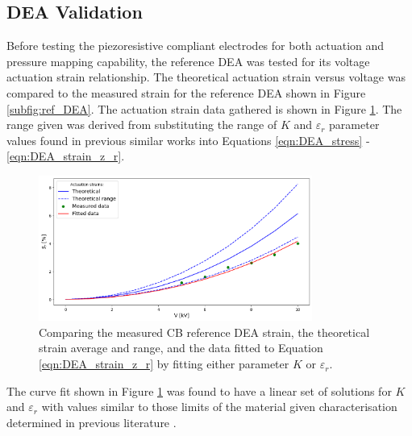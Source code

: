 \subsection{DEA Validation}
\label{subsec:dea_validation2}
Before testing the piezoresistive compliant electrodes for both actuation and pressure mapping capability, the reference DEA was tested for its voltage actuation strain relationship. The theoretical actuation strain versus voltage was compared to the measured strain for the reference DEA shown in Figure \ref{subfig:ref_DEA}. The actuation strain data gathered is shown in Figure \ref{fig:ref_DEA_results}. The range given was derived from substituting the range of $K$ and $\varepsilon_r$ parameter values found in previous similar works\cite{Liu2018, Helal2018, Huang2023} into Equations \ref{eqn:DEA_stress} - \ref{eqn:DEA_strain_z_r}.
\begin{figure}[H]
	\centering
	\includegraphics[width = 0.8\textwidth]{Figures/CB_vs_theory_range_vs_fitv2.png} %
	\vspace{0.2cm}
	\caption{Comparing the measured CB reference DEA strain, the theoretical strain average and range, and the data fitted to Equation \ref{eqn:DEA_strain_z_r} by fitting either parameter $K$ or $\varepsilon_r$.}
	\label{fig:ref_DEA_results}
\end{figure}
The curve fit shown in Figure \ref{fig:ref_DEA_results} was found to have a linear set of solutions for $K$ and $\varepsilon_r$ with values similar to those limits of the material given characterisation determined in previous literature \cite{Carpi2003} .

